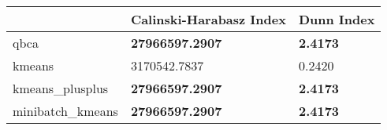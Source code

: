 \begin{table}[htbp]
\centering
\begin{tabular}{lll}
\toprule
 & Calinski-Harabasz Index & Dunn Index \\
\midrule
qbca & \textbf{27966597.2907} & \textbf{2.4173} \\
kmeans & 3170542.7837 & 0.2420 \\
kmeans_plusplus & \textbf{27966597.2907} & \textbf{2.4173} \\
minibatch_kmeans & \textbf{27966597.2907} & \textbf{2.4173} \\
\bottomrule
\end{tabular}
\end{table}
